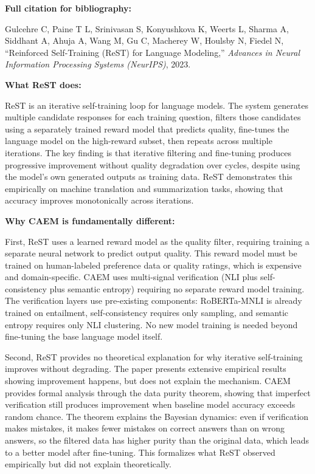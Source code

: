 \documentclass[11pt,a4paper]{article}
\newcommand{\citationbox}[2]{%
\begin{tcolorbox}[enhanced,breakable,
  colback=LightNavy,colframe=NavyBlue,boxrule=1.5pt,arc=4pt,
  left=8pt,right=8pt,top=6pt,bottom=6pt,
  title={\bfseries\small\color{white}#1},
  attach boxed title to top left={yshift=-2mm,xshift=6mm},
  boxed title style={colback=NavyBlue,arc=3pt,boxrule=0pt,
    left=4pt,right=4pt,top=2pt,bottom=2pt}]
#2
\end{tcolorbox}}
\begin{document}
\citationbox{CITATION 2: ReST — Reinforced Self-Training}{
\textbf{Full citation for bibliography:}

Gulcehre C, Paine T L, Srinivasan S, Konyushkova K, Weerts L, Sharma A, Siddhant A, Ahuja A, Wang M, Gu C, Macherey W, Houlsby N, Fiedel N, ``Reinforced Self-Training (ReST) for Language Modeling,'' \textit{Advances in Neural Information Processing Systems (NeurIPS)}, 2023.

\textbf{What ReST does:}

ReST is an iterative self-training loop for language models. The system generates multiple candidate responses for each training question, filters those candidates using a separately trained reward model that predicts quality, fine-tunes the language model on the high-reward subset, then repeats across multiple iterations. The key finding is that iterative filtering and fine-tuning produces progressive improvement without quality degradation over cycles, despite using the model's own generated outputs as training data. ReST demonstrates this empirically on machine translation and summarization tasks, showing that accuracy improves monotonically across iterations.

\textbf{Why CAEM is fundamentally different:}

First, ReST uses a learned reward model as the quality filter, requiring training a separate neural network to predict output quality. This reward model must be trained on human-labeled preference data or quality ratings, which is expensive and domain-specific. CAEM uses multi-signal verification (NLI plus self-consistency plus semantic entropy) requiring no separate reward model training. The verification layers use pre-existing components: RoBERTa-MNLI is already trained on entailment, self-consistency requires only sampling, and semantic entropy requires only NLI clustering. No new model training is needed beyond fine-tuning the base language model itself.

Second, ReST provides no theoretical explanation for why iterative self-training improves without degrading. The paper presents extensive empirical results showing improvement happens, but does not explain the mechanism. CAEM provides formal analysis through the data purity theorem, showing that imperfect verification still produces improvement when baseline model accuracy exceeds random chance. The theorem explains the Bayesian dynamics: even if verification makes mistakes, it makes fewer mistakes on correct answers than on wrong answers, so the filtered data has higher purity than the original data, which leads to a better model after fine-tuning. This formalizes what ReST observed empirically but did not explain theoretically.

}
\end{document}
